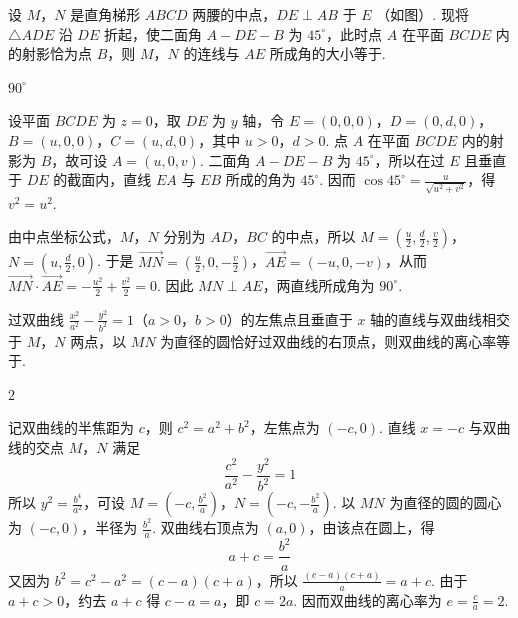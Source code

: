 \begin{problem}
设 \(M\)，\(N\) 是直角梯形 \(ABCD\) 两腰的中点，\(DE \perp AB\) 于 \(E\) （如图）. 现将 \(\triangle ADE\) 沿 \(DE\) 折起，使二面角 \(A - DE - B\) 为 \(45^\circ\)，此时点 \(A\) 在平面 \(BCDE\) 内的射影恰为点 \(B\)，则 \(M\)，\(N\) 的连线与 \(AE\) 所成角的大小等于\fillinblank{}.


\begin{answer}
\(90^\circ\)
\end{answer}

\begin{solution}
设平面 \(BCDE\) 为 \(z=0\)，取 \(DE\) 为 \(y\) 轴，令 \(E=(0,0,0)\)，\(D=(0,d,0)\)，\(B=(u,0,0)\)，\(C=(u,d,0)\)，其中 \(u>0\)，\(d>0\). 点 \(A\) 在平面 \(BCDE\) 内的射影为 \(B\)，故可设 \(A=(u,0,v)\). 二面角 \(A-DE-B\) 为 \(45^\circ\)，所以在过 \(E\) 且垂直于 \(DE\) 的截面内，直线 \(EA\) 与 \(EB\) 所成的角为 \(45^\circ\). 因而
\(\displaystyle \cos45^\circ=\frac{u}{\sqrt{u^2+v^2}}\)，得 \(v^2=u^2\).

由中点坐标公式，\(M\)，\(N\) 分别为 \(AD\)，\(BC\) 的中点，所以
\(\displaystyle M=(\frac{u}{2},\frac{d}{2},\frac{v}{2})\)，\(N=(u,\frac{d}{2},0)\). 于是
\(\overrightarrow{MN}=(\frac{u}{2},0,-\frac{v}{2})\)，\(\overrightarrow{AE}=(-u,0,-v)\)，从而
\(\overrightarrow{MN}\cdot\overrightarrow{AE}=-\frac{u^2}{2}+\frac{v^2}{2}=0\). 因此 \(MN\perp AE\)，两直线所成角为 \(90^\circ\).
\end{solution}
\end{problem}

\begin{problem}
过双曲线 \( \frac{x^{2}}{a^{2}} - \frac{y^{2}}{b^{2}} = 1 \)（\(a > 0\)，\(b > 0\)）的左焦点且垂直于 \(x\) 轴的直线与双曲线相交于 \(M\)，\(N\) 两点，以 \(MN\) 为直径的圆恰好过双曲线的右顶点，则双曲线的离心率等于\fillinblank{}.

\begin{answer}
\(2\)
\end{answer}

\begin{solution}
记双曲线的半焦距为 \(c\)，则 \(c^2=a^2+b^2\)，左焦点为 \((-c,0)\). 直线 \(x=-c\) 与双曲线的交点 \(M\)，\(N\) 满足
\[
\frac{c^2}{a^2}-\frac{y^2}{b^2}=1
\]
所以 \(y^2=\frac{b^4}{a^2}\)，可设 \(M=(-c,\frac{b^2}{a})\)，\(N=(-c,-\frac{b^2}{a})\). 以 \(MN\) 为直径的圆的圆心为 \((-c,0)\)，半径为 \(\frac{b^2}{a}\). 双曲线右顶点为 \((a,0)\)，由该点在圆上，得
\[
a+c=\frac{b^2}{a}
\]
又因为 \(b^2=c^2-a^2=(c-a)(c+a)\)，所以
\(\displaystyle \frac{(c-a)(c+a)}{a}=a+c\). 由于 \(a+c>0\)，约去 \(a+c\) 得 \(c-a=a\)，即 \(c=2a\). 因而双曲线的离心率为 \(e=\frac{c}{a}=2\).
\end{solution}
\end{problem}

